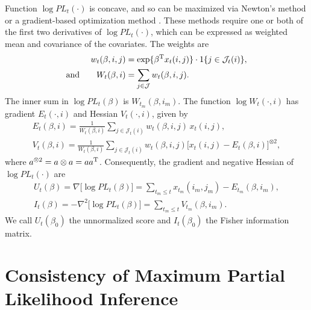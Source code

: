 \documentclass[aoas,preprint]{imsart}
\begin{document}
Function $\log \mathit{PL}_t(\cdot)$ is concave, and so can be maximized
via Newton's method or a gradient-based optimization method
\cite{nocedal2006numerical}.  These methods require one or both of the
first two derivatives of $\log\mathit{PL}_t(\cdot)$, which can be
expressed as weighted mean and covariance of the covariates.  The weights are
\begin{subequations}
\begin{align}
    w_{t}(\beta, i,j)
        &=
        \exp\{ \beta^\trans x_t(i,j) \}
        \cdot
        1\{ j \in \mathcal{J}_t(i)\}, \\
    \text{and}\qquad
    W_{t}(\beta, i)
        &=
        \sum_{j \in \mathcal{J}} w_{t}(\beta, i,j).
\end{align}
\end{subequations}
The inner sum in $\log \mathit{PL}_t(\beta)$ is
$W_{t_m}\!(\beta, i_m)$.  The function
$\log W_{t}(\cdot, i)$ has gradient $E_{t}(\cdot, i)$ and Hessian
$V_{t}(\cdot, i)$, given by
\begin{subequations}
\begin{gather}
    E_{t}(\beta, i)
        =
        \frac{1}{W_{t}(\beta, i)}
        \sum_{j \in \mathcal{J}_t(i)}
            w_{t}(\beta, i,j) \, x_{t}(i,j), \label{E:wt-expectation}\\
    V_{t}(\beta, i)
        =
        \frac{1}{W_{t}(\beta, i)}
        \sum_{j \in \mathcal{J}_t(i)}
            w_{t}(\beta, i,j)
            \Big[ x_{t}(i,j) - E_{t}(\beta, i)\Big]^{\otimes 2},
\end{gather}
\end{subequations}
where $a^{\otimes 2} = a \otimes a = a a^{\mathrm{T}}$.
Consequently, the gradient and negative Hessian of
$\log \mathit{PL}_t(\cdot)$ are
\begin{subequations}
\begin{gather}
    \label{E:log-pl-gradient}
    U_t(\beta)
        =
        \nabla \big[ \log \mathit{PL}_t(\beta) \big]
        =
        \sum_{t_m \leq t}
            x_{t_m}(i_m, j_m) - E_{t_m}(\beta, i_m), \\
    \label{E:log-pl-neg-hessian}
    I_t(\beta)
        =
        -\nabla^2 \big[ \log \mathit{PL}_t(\beta) \big]
        =
        \sum_{t_m \leq t}
            V_{t_m}(\beta, i_m).
\end{gather}
\end{subequations}
We call $U_t(\beta_0)$ the unnormalized score and $I_t(\beta_0)$
the Fisher information matrix.

\section{Consistency of Maximum Partial Likelihood Inference}
\label{S:MPLE-consistency}
\end{document}

